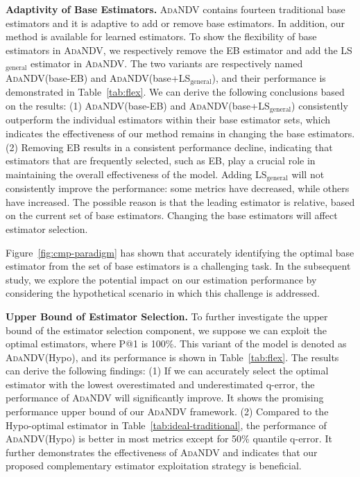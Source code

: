 \noindent\textbf{Adaptivity of Base Estimators.} \textsc{AdaNDV} contains fourteen traditional base estimators and it is adaptive to add or remove base estimators. In addition, our method is available for learned estimators. To show the flexibility of base estimators in \textsc{AdaNDV}, we respectively remove the EB estimator and add the LS$_\mathrm{general}$ estimator in \textsc{AdaNDV}. The two variants are respectively named \textsc{AdaNDV}{(base}-EB{)} and \textsc{AdaNDV}{(base}+LS$_\mathrm{general}${)}, and their performance is demonstrated in Table~\ref{tab:flex}. We can derive the following conclusions based on the results: {(1)} \textsc{AdaNDV}{(base}-EB{)} and \textsc{AdaNDV}{(base}+LS$_\mathrm{general}${)} consistently outperform the individual estimators within their base estimator sets, which indicates the effectiveness of our method remains in changing the base estimators. {(2)}  Removing EB results in a consistent performance decline, indicating that estimators that are frequently selected, such as EB, play a crucial role in maintaining the overall effectiveness of the model. Adding LS$_\mathrm{general}$ will not consistently improve the performance: some metrics have decreased, while others have increased. The possible reason is that the leading estimator is relative, based on the current set of base estimators. 
Changing the base estimators will affect estimator selection.

Figure~\ref{fig:cmp-paradigm} has shown that accurately identifying the optimal base estimator from the set of base estimators is a challenging task. In the subsequent study, we explore the potential impact on our estimation performance by considering the hypothetical scenario in which this challenge is addressed.





\noindent\textbf{Upper Bound {of Estimator Selection}.} 
To further investigate the upper bound of the estimator selection component, we suppose we can exploit the optimal estimators, where P@1 is {100\%}. This variant of the model is denoted as \textsc{AdaNDV}(Hypo), and its performance is shown in Table~\ref{tab:flex}. The results can derive the following findings: {(1)} If we can accurately select the optimal estimator with the lowest overestimated and underestimated q-error, the performance of \textsc{AdaNDV} will significantly improve. It shows the promising performance upper bound of our \textsc{AdaNDV} framework.
{(2)} Compared to the Hypo-optimal estimator in Table~\ref{tab:ideal-traditional}, the performance of \textsc{AdaNDV}(Hypo) is better in most metrics except for 50\% quantile q-error. It further demonstrates the effectiveness of \textsc{AdaNDV} and indicates that our proposed complementary estimator exploitation strategy is beneficial.


